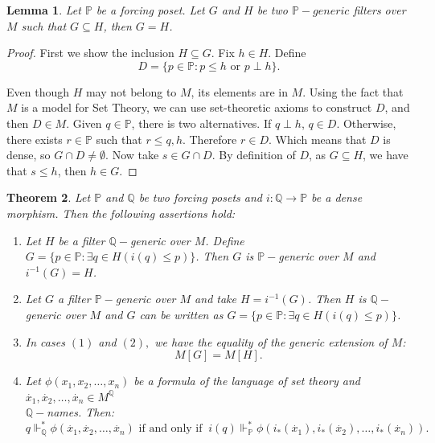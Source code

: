 \documentclass[10pt,longbibliography]{article}
\newtheorem{Theo}{Theorem}[section]
\newtheorem{Lemma}[Theo]{Lemma}
\newcommand{\Po}{\mathbb{P}}
\newcommand{\Qo}{\mathbb{Q}}
\newcommand{\xdot}{\overset{.}{x}}
\newcommand{\forces}{\Vdash^{*}}
\begin{document}
\begin{Lemma}
	Let $\Po$ be a forcing poset. Let $G$ and $H$ be two $\Po-generic$ filters over $M$ such that $G \subseteq H$, then $G = H$. 
\end{Lemma}
\begin{proof}
	First we show the inclusion $H \subseteq G$. Fix $h \in  H$. Define $$D =\{ p \in \Po: p \leq h \text{ or } p \perp h\}.$$ 
	
	Even though $H$ may not belong to $M$, its elements are in $M$. Using the fact that $M$ is a model for Set Theory, we can use set-theoretic axioms to construct $D$, and then $D \in M$. Given $q \in \Po$, there is two alternatives. If $q \perp h$, $q \in D$. Otherwise, there exists $r \in \Po$ such that $r \leq q,h$. Therefore $r \in D$. Which means that $D$ is dense, so $G \cap D \neq \emptyset$. Now take $s \in G \cap D$. By definition of $D$, as $G \subseteq H$, we have that $s \leq h$, then $h \in G$.
\end{proof}

\begin{Theo}\label{forcinganddensemorphism}
	Let $\Po$ and $\Qo$ be two forcing posets and $i: \Qo \to \Po$ be a dense morphism. Then the following assertions hold:
	\begin{enumerate}
		\item\label{item1} Let $H$ be a filter $\Qo-$generic over $M$. Define $G = \{p \in \Po: \exists q \in H(i(q) \leq p)\}$. Then $G$ is $\Po-$generic over $M$ and $i^{-1}(G) = H$.
		\item\label{item2} Let $G$ a filter $\Po-$generic over $M$ and take $H = i^{-1}(G)$. Then $H$ is $\Qo-$generic over $M$ and $G$ can be written as $G = \{p \in \Po: \exists q \in H(i(q) \leq p)\}$.
		
		\item\label{item3} In cases $(1)$ and $(2),$ we have the equality of the generic extension of $M$: $$M[G] = M[H].$$
		
		\item\label{item4} Let $\phi(x_{1},x_{2},\dots,x_{n})$ be a formula of the language of set theory and   $\xdot_{1},\xdot_{2},\dots,\xdot_{n} \in M^{\Qo}$ \\ $\Qo-$names. Then:
		$$q \forces_{\Qo} \phi(\xdot_{1},\xdot_{2},\dots,\xdot_{n}) \text{ if and only if } ~i(q) \forces_{\Po} \phi(i_{*}(\xdot_{1}),i_{*}(\xdot_{2}),\dots,i_{*}(\xdot_{n})).$$
	\end{enumerate}
\end{Theo}
\end{document}
